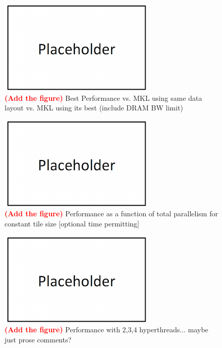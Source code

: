 \documentclass[conference]{IEEEtran}
\newcommand{\fix}[1]{{\bf \textcolor {red}{#1}}}
\begin{document}
\begin{figure}%
\centering
\includegraphics[width=0.9\columnwidth]{figures/placeholder.png}
\caption{\fix{(Add the figure)} 
Best Performance vs. MKL using same data layout vs. MKL using its best
(include DRAM BW limit) }
\end{figure}

\begin{figure}%
\centering
\includegraphics[width=0.9\columnwidth]{figures/placeholder.png}
\caption{\fix{(Add the figure)} 
Performance as a function of total parallelism for constant tile size
[optional time permitting] }
\end{figure}

\begin{figure}%
\centering
\includegraphics[width=0.9\columnwidth]{figures/placeholder.png}
\caption{\fix{(Add the figure)} 
Performance with 2,3,4 hyperthreads...  maybe just prose comments?  }
\end{figure}
\end{document}
